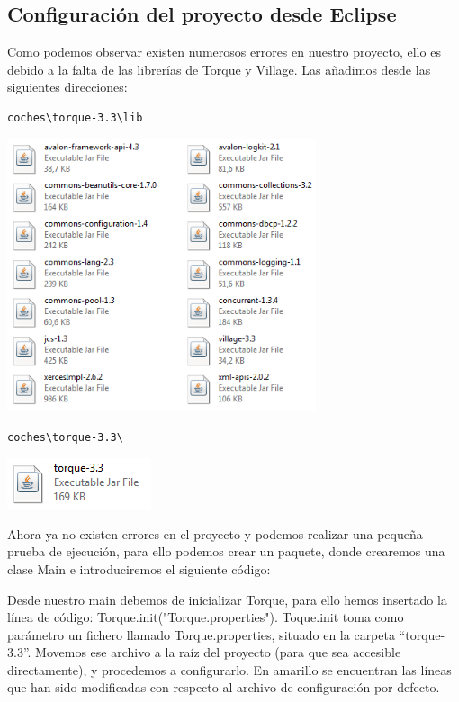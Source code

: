 \documentclass[12pt, oneside]{article}
\begin{document}
\subsection{Configuración del proyecto desde Eclipse}
Como podemos observar existen numerosos errores en nuestro proyecto, ello es debido a la falta de las librerías de Torque y Village. Las añadimos desde las siguientes direcciones:

\begin{lstlisting}
coches\torque-3.3\lib
\end{lstlisting}

	\begin{center}
		\includegraphics[height=8cm]{img/torque-lib.png}
	\end{center}
	
\begin{lstlisting}
coches\torque-3.3\
\end{lstlisting}

	\begin{center}
		\includegraphics{img/torque-file.png}
	\end{center}
	
	Ahora ya no existen errores en el proyecto y podemos realizar una pequeña prueba de ejecución, para ello podemos crear un paquete, donde crearemos una clase Main e introduciremos el siguiente código:
	
	
	
	Desde nuestro main debemos de inicializar Torque, para ello hemos insertado la línea de código: Torque.init("Torque.properties"). Toque.init toma como parámetro un fichero llamado Torque.properties, situado en la carpeta “torque-3.3”. Movemos ese archivo a la raíz del proyecto (para que sea accesible directamente), y procedemos a configurarlo. En amarillo se encuentran las líneas que han sido modificadas con respecto al archivo de configuración por defecto.
	
\end{document}
